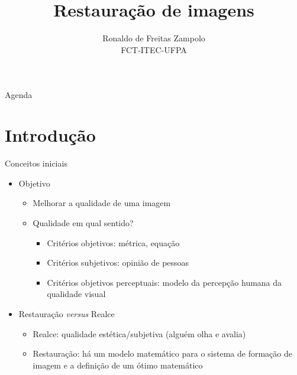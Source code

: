 

\DeclareMathOperator*{\mediana}{mediana}

\title{\cursogrande\\ \vspace{1cm}Restauração de imagens}
\author{Ronaldo de Freitas Zampolo\\FCT-ITEC-UFPA}


   \maketitle[randomdots={false}]
   \begin{slide}{Agenda}
      \tableofcontents[content=sections]
   \end{slide}

\section[ slide = true]{Introdução}
   \begin{slide}[toc=]{Conceitos iniciais}
      \begin{itemize}
       \item Objetivo
	       \begin{itemize}
		       \item Melhorar a qualidade de uma imagem
		       \item Qualidade em qual sentido? 
			       \begin{itemize}
				       \item Critérios objetivos: métrica, equação
				       \item Critérios subjetivos: opinião de pessoas
				       \item Critérios objetivos perceptuais: modelo da percepção humana da qualidade visual
			       \end{itemize}
	       \end{itemize}
       \item Restauração \emph{versus} Realce 
	       \begin{itemize}
		       \item Realce: qualidade estética/subjetiva (alguém olha e avalia)
		       \item Restauração: há um modelo matemático para o sistema de formação de imagem e a definição de um ótimo matemático
	       \end{itemize}
       \end{itemize}
   \end{slide}

